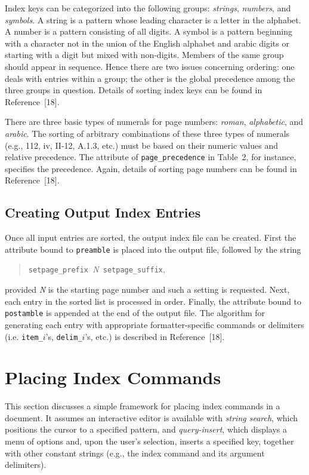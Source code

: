 Index keys can be categorized into the following groups:
{\it strings\/}, {\it numbers\/}, and {\it symbols\/}.
A string is a pattern whose leading character is a letter in the alphabet.
A number is a pattern consisting of all digits.  A symbol is a pattern
beginning with a character not in the union of the English alphabet and
arabic digits or starting with a digit but mixed with non-digits.
Members of the same group should appear in sequence.
Hence there are two issues concerning ordering:
one deals with entries within a group; the other is
the global precedence among the three groups in question.
Details of sorting index keys can be found in Reference~[18].

There are three basic types of numerals for page numbers: {\it roman\/},
{\it alphabetic\/}, and {\it arabic\/}.
The sorting of arbitrary combinations of these three types of numerals
(e.g., 112, iv, II-12, A.1.3, etc.)
must be based on their numeric values and relative precedence.
The attribute of \verb|page_precedence| in Table~2, for instance, specifies
the precedence.  Again, details of sorting page numbers can be found in
Reference~[18].

\subsection{Creating Output Index Entries}
Once all input entries are sorted, the output index file can be
created.  First the attribute bound to \verb|preamble| is placed into
the output file, followed by the string
\begin{quote}
  \verb|setpage_prefix |{\sl N\/}\verb| setpage_suffix|,
\end{quote}
provided {\sl N\/} is the starting page number and
such a setting is requested.  Next, each entry in the sorted list
is processed in order.  Finally, the attribute bound to \verb|postamble|
is appended at the end of the output file.
The algorithm for generating each entry with appropriate formatter-specific
commands or delimiters (i.e. \verb|item_|$i$'s, \verb|delim_|$i$'s, etc.)
is described in Reference~[18].

\section{Placing Index Commands}
This section discusses a simple framework for placing index commands
in a document.  It assumes an interactive editor is available with
{\it string search\/}, which positions the cursor to a specified pattern, and
{\it query-insert\/}, which displays a menu of
options and, upon the user's selection, inserts
a specified key, together with other constant strings (e.g.,
the index command and its argument delimiters).


